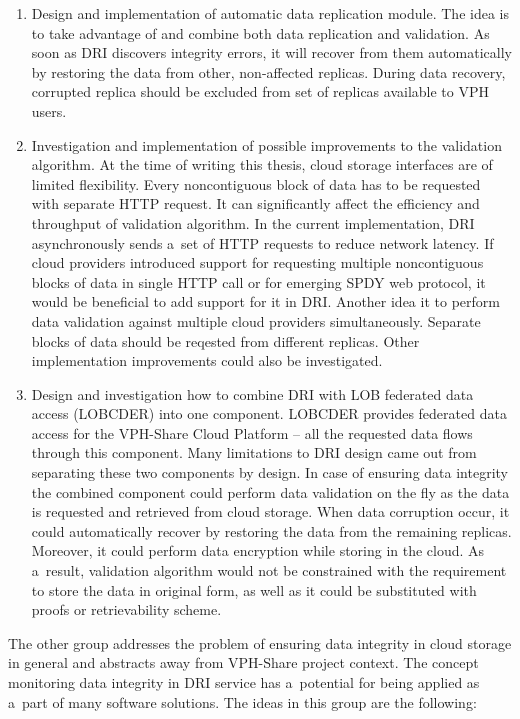 \begin{enumerate}
\item Design and implementation of automatic data replication module. The idea
is to take advantage of and combine both data replication and validation. As soon as
DRI discovers integrity errors, it will recover from them automatically by restoring
the data from other, non-affected replicas. During data recovery, corrupted replica
should be excluded from set of replicas available to VPH users.

\item Investigation and implementation of possible improvements to the validation
algorithm. At the time of writing this thesis, cloud storage interfaces are of
limited flexibility. Every noncontiguous block of data has to be requested with 
separate HTTP request. It can significantly affect the efficiency and throughput
of validation algorithm. In the current implementation, DRI asynchronously sends
a~set of HTTP requests to reduce network latency. If cloud providers introduced
support for requesting multiple noncontiguous blocks of data in single HTTP call
or for emerging SPDY web protocol, it would be beneficial to add support for it
in DRI. Another idea it to perform data validation against multiple cloud providers
simultaneously. Separate blocks of data should be reqested from different replicas.
Other implementation improvements could also be investigated.

\item Design and investigation how to combine DRI with LOB federated data access
(LOBCDER) into one component. LOBCDER provides federated data access for the VPH-Share
Cloud Platform -- all the requested data flows through this component. Many limitations
to DRI design came out from separating these two components by design. In case of
ensuring data integrity the combined component could perform data validation
on the fly as the data is requested and retrieved from cloud storage. When data corruption
occur, it could automatically recover by restoring the data from the remaining replicas.
Moreover, it could perform data encryption while storing in the cloud. As a~result,
validation algorithm would not be constrained with the requirement to store the data
in original form, as well as it could be substituted with proofs or retrievability
scheme.
\end{enumerate}
 
The other group addresses the problem of ensuring data integrity in cloud storage
in general and abstracts away from VPH-Share project context. The concept monitoring
data integrity in DRI service has a~potential for being applied as a~part of many
software solutions. The ideas in this group are the following:

